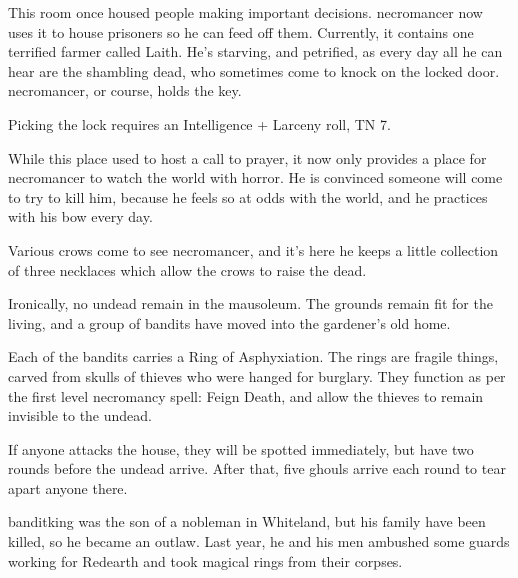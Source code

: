 \begin{multicols}{2}

This room once housed people making important decisions.  \Gls{necromancer} now uses it to house prisoners so he can feed off them.  Currently, it contains one terrified farmer called Laith.  He's starving, and petrified, as every day all he can hear are the shambling dead, who sometimes come to knock on the locked door.  \Gls{necromancer}, or course, holds the key.

Picking the lock requires an Intelligence + Larceny roll, TN 7.


\humanfarmer



While this place used to host a call to prayer, it now only provides a place for \gls{necromancer} to watch the world with horror.  He is convinced someone will come to try to kill him, because he feels so at odds with the world, and he practices with his bow every day.

Various crows come to see \gls{necromancer}, and it's here he keeps a little collection of three necklaces which allow the crows to raise the dead.


Ironically, no undead remain in the mausoleum.  The grounds remain fit for the living, and a group of bandits have moved into the gardener's old home.

Each of the bandits carries a Ring of Asphyxiation.  The rings are fragile things, carved from skulls of thieves who were hanged for burglary.  They function as per the first level necromancy spell: Feign Death, and allow the thieves to remain invisible to the undead.

If anyone attacks the house, they will be spotted immediately, but have two rounds before the undead arrive.  After that, five ghouls arrive each round to tear apart anyone there.



\Gls{banditking} was the son of a nobleman in Whiteland, but his family have been killed, so he became an outlaw.
Last year, he and his men ambushed some guards working for Redearth and took magical rings from their corpses.



\end{multicols}
